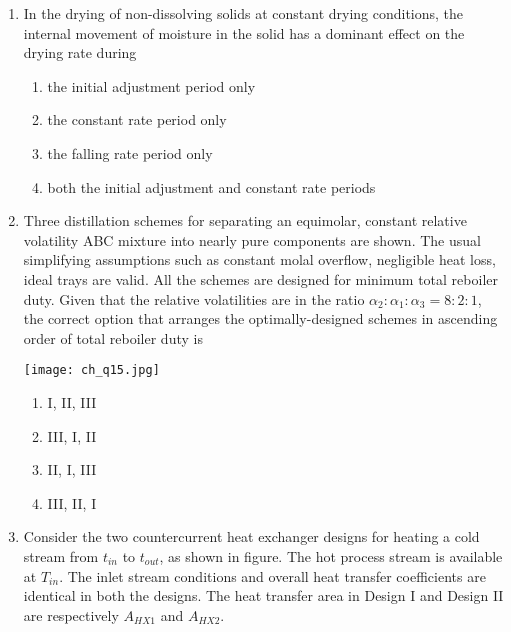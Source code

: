 \documentclass[12pt]{article}
\begin{document}
\begin{enumerate}[label=Q.\arabic*]
	\item In the drying of non-dissolving solids at constant drying conditions, the internal movement of moisture in the solid has a dominant effect on the drying rate during
		\begin{multicols}{2}
			\begin{enumerate}[label=(\Alph*)]
				\item the initial adjustment period only
				\item the constant rate period only
				\item the falling rate period only
				\item both the initial adjustment and constant rate periods
			\end{enumerate}
		\end{multicols}

	\item Three distillation schemes for separating an equimolar, constant relative volatility ABC mixture into nearly pure components are shown. The usual simplifying assumptions such as constant molal overflow, negligible heat loss, ideal trays are valid. All the schemes are designed for minimum total reboiler duty. Given that the relative volatilities are in the ratio $\alpha_2 : \alpha_1 : \alpha_3 = 8:2:1$, the correct option that arranges the optimally-designed schemes in ascending order of total reboiler duty is

		\begin{center}{
				\texttt{[image: ch\_q15.jpg]}
		}\end{center}

		\begin{multicols}{2}
			\begin{enumerate}[label=(\Alph*)]
				\item I, II, III
				\item III, I, II
				\item II, I, III
				\item III, II, I
			\end{enumerate}
		\end{multicols}

	\item Consider the two countercurrent heat exchanger designs for heating a cold stream from $t_{in}$ to $t_{out}$, as shown in figure. The hot process stream is available at $T_{in}$. The inlet stream conditions and overall heat transfer coefficients are identical in both the designs. The heat transfer area in Design I and Design II are respectively $A_{HX1}$ and $A_{HX2}$.


\end{enumerate}
\end{document}
